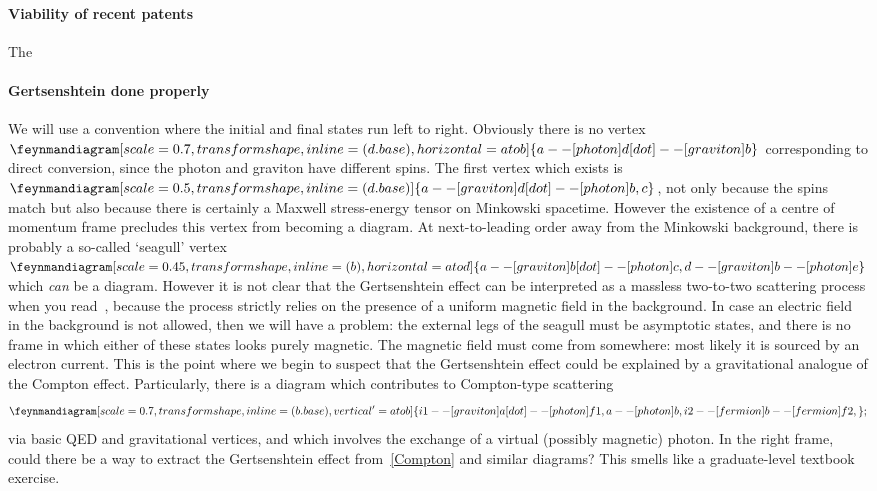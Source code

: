 \documentclass[aps,prd,reprint,preprintnumbers,showpacs,floatfix,nofootinbib,superscript address,longbibliography]{revtex4-2}
\begin{document}
\paragraph*{Viability of recent patents} The
\paragraph*{Gertsenshtein done properly} We will use a convention where the initial and final states run left to right. Obviously there is no vertex $\feynmandiagram[scale=0.7,transform shape, inline=(d.base), horizontal=a to b]{a -- [photon] d [dot] -- [graviton] b}$ corresponding to direct conversion, since the photon and graviton have different spins. The first vertex which exists is $\feynmandiagram[scale=0.5,transform shape, inline=(d.base)]{a -- [graviton] d [dot] -- [photon] {b,c}}$, not only because the spins match but also because there is certainly a Maxwell stress-energy tensor on Minkowski spacetime. However the existence of a centre of momentum frame precludes this vertex from becoming a diagram. At next-to-leading order away from the Minkowski background, there is probably a so-called `seagull' vertex $\feynmandiagram[scale=0.45,transform shape, inline=(b), horizontal=a to d]{a -- [graviton] b [dot] -- [photon] c,d -- [graviton] b -- [photon] e}$ which \emph{can} be a diagram. However it is not clear that the Gertsenshtein effect can be interpreted as a massless two-to-two scattering process when you read~\cite{Palessandro:2023tee}, because the process strictly relies on the presence of a uniform magnetic field in the background. In case an electric field in the background is not allowed, then we will have a problem: the external legs of the seagull must be asymptotic states, and there is no frame in which either of these states looks purely magnetic. The magnetic field must come from somewhere: most likely it is sourced by an electron current. This is the point where we begin to suspect that the Gertsenshtein effect could be explained by a gravitational analogue of the Compton effect. Particularly, there is a diagram which contributes to Compton-type scattering 
\begin{equation}\label{Compton}
\feynmandiagram [scale=0.7,transform shape, inline=(b.base),vertical'=a to b] {
i1 
-- [graviton] a [dot]
-- [photon] f1,
a -- [photon] b,
i2 
-- [fermion] b
-- [fermion] f2,
};
\end{equation}
via basic QED and gravitational vertices, and which involves the exchange of a virtual (possibly magnetic) photon. In the right frame, could there be a way to extract the Gertsenshtein effect from~\cref{Compton} and similar diagrams? This smells like a graduate-level textbook exercise.
\end{document}
